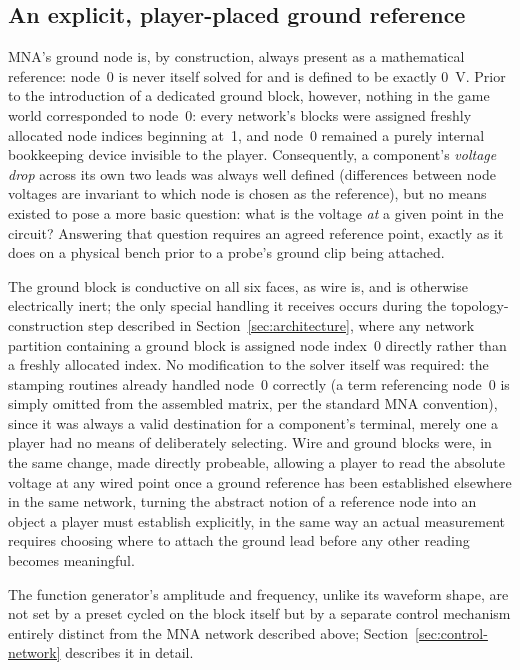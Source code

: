 \subsection{An explicit, player-placed ground reference}

MNA's ground node is, by construction, always present as a mathematical reference: node~0
is never itself solved for and is defined to be exactly $0$~V. Prior to the introduction of
a dedicated ground block, however, nothing in the game world corresponded to node~0: every
network's blocks were assigned freshly allocated node indices beginning at~1, and node~0
remained a purely internal bookkeeping device invisible to the player. Consequently, a
component's \emph{voltage drop} across its own two leads was always well defined
(differences between node voltages are invariant to which node is chosen as the reference),
but no means existed to pose a more basic question: what is the voltage \emph{at} a given
point in the circuit? Answering that question requires an agreed reference point, exactly as
it does on a physical bench prior to a probe's ground clip being attached.

The ground block is conductive on all six faces, as wire is, and is otherwise electrically
inert; the only special handling it receives occurs during the topology-construction step
described in Section~\ref{sec:architecture}, where any network partition containing a
ground block is assigned node index~0 directly rather than a freshly allocated index. No
modification to the solver itself was required: the stamping routines already handled
node~0 correctly (a term referencing node~0 is simply omitted from the assembled matrix,
per the standard MNA convention), since it was always a valid destination for a component's
terminal, merely one a player had no means of deliberately selecting. Wire and ground blocks
were, in the same change, made directly probeable, allowing a player to read the absolute
voltage at any wired point once a ground reference has been established elsewhere in the
same network, turning the abstract notion of a reference node into an object a player must
establish explicitly, in the same way an actual measurement requires choosing where to
attach the ground lead before any other reading becomes meaningful.

The function generator's amplitude and frequency, unlike its waveform shape, are not set by
a preset cycled on the block itself but by a separate control mechanism entirely distinct
from the MNA network described above; Section~\ref{sec:control-network} describes it in
detail.

